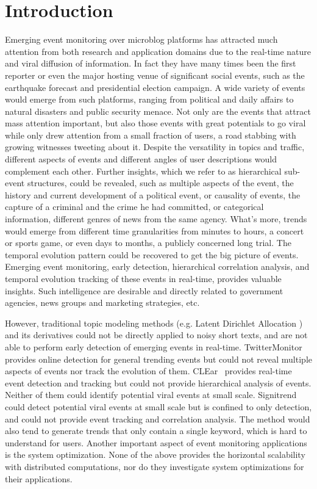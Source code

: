 \section{Introduction}

Emerging event monitoring over microblog platforms has attracted much attention from both research and application domains due to the real-time nature and viral diffusion of information.
In fact they have many times been the first reporter or even the major hosting venue of significant social events, such as the earthquake forecast and presidential election campaign.
A wide variety of events would emerge from such platforms, ranging from political and daily affairs to natural disasters and public security menace.
Not only are the events that attract mass attention important, but also those events with great potentials to go viral while only drew attention from a small fraction of users, \eg a road stabbing with growing witnesses tweeting about it.
Despite the versatility in topics and traffic, different aspects of events and different angles of user descriptions would complement each other.
Further insights, which we refer to as hierarchical sub-event structures, could be revealed, such as multiple aspects of the event, \eg the history and current development of a political event, or causality of events, \eg the capture of a criminal and the crime he had committed, or categorical information, \eg different genres of news from the same agency.
What's more, trends would emerge from different time granularities from minutes to hours, \eg a concert or sports game, or even days to months, \eg a publicly concerned long trial.
The temporal evolution pattern could be recovered to get the big picture of events.
Emerging event monitoring, \ie early detection, hierarchical correlation analysis, and temporal evolution tracking of these events in real-time, provides valuable insights. %
Such intelligence are desirable and directly related to government agencies, news groups and marketing strategies, etc.

However, traditional topic modeling methods (e.g. Latent Dirichlet Allocation%
) and its derivatives could not be directly applied to noisy short texts, and are not able to perform early detection of emerging events in real-time.
TwitterMonitor~\cite{ mathioudakis2010twittermonitor} provides online detection for general trending events but could not reveal multiple aspects of events nor track the evolution of them.
CLEar~\cite{xie2014clear} provides real-time event detection and tracking but could not provide hierarchical analysis of events.
Neither of them could identify potential viral events at small scale.
Signitrend~\cite{schubert2014signitrend} could detect potential viral events at small scale but is confined to only detection, and could not provide event tracking and correlation analysis.
The method would also tend to generate trends that only contain a single keyword, which is hard to understand for users.
Another important aspect of event monitoring applications is the system optimization.
None of the above provides the horizontal scalability with distributed computations, nor do they investigate system optimizations for their applications.


